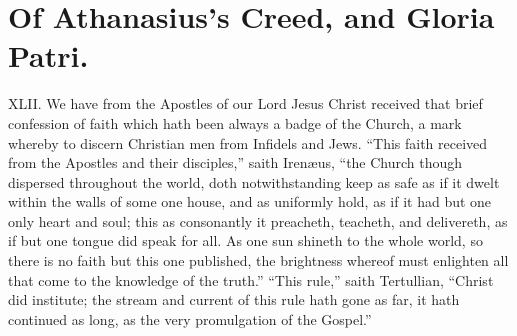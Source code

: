 \section*{Of Athanasius’s Creed, and Gloria Patri.}
XLII. We have from the Apostles of our Lord Jesus Christ received that brief confession of faith which hath been  always a badge of the Church, a mark whereby to discern Christian men from Infidels and Jews. “This faith received from the Apostles and their disciples,” saith Irenæus, “the Church though dispersed throughout the world, doth notwithstanding keep as safe as if it dwelt within the walls of some one house,
 and as uniformly hold, as if it had but one only heart and soul; this as consonantly it preacheth, teacheth, and delivereth, as if but one tongue did speak for all. As one sun shineth to the whole world, so there is no faith but this one published, the brightness whereof must enlighten all that come to the knowledge of the truth.” “This rule,” saith Tertullian, “Christ did institute; the stream and current of this rule hath gone as far, it hath continued as long, as the very promulgation of the Gospel.”

